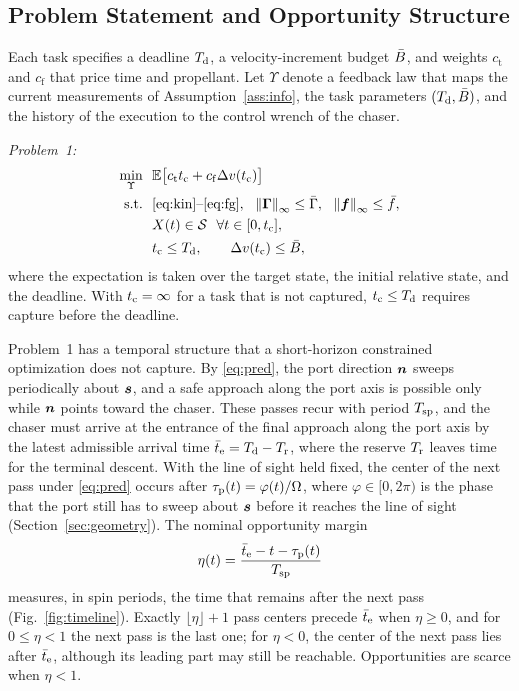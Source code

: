 \subsection{Problem Statement and Opportunity Structure}\label{sec:mission}

Each task specifies a deadline $T_{\mathrm{d}}$, a velocity-increment budget $\bar B$, and weights $c_{\mathrm{t}}$ and $c_{\mathrm{f}}$ that price time and propellant. Let $\Upsilon$ denote a feedback law that maps the current measurements of Assumption~\ref{ass:info}, the task parameters $(T_{\mathrm{d}},\bar B)$, and the history of the execution to the control wrench of the chaser.

\noindent\textit{Problem~1:}
\begin{equation}\label{eq:problem}
\begin{aligned}
\min_{\Upsilon}\ \ & \E\bigl[c_{\mathrm{t}}\tc+c_{\mathrm{f}}\Delta v(\tc)\bigr]\\
\text{s.t.}\ \ & \eqref{eq:kin}\text{--}\eqref{eq:fg},\ \ \norm{\bG}_{\infty}\le\Gmax,\ \ \norm{\bff}_{\infty}\le\fmax,\\
& X(t)\in\Sset\ \ \forall t\in[0,\tc],\\
& \tc\le\Td,\qquad \Delta v(\tc)\le\Bmax,
\end{aligned}
\end{equation}
where the expectation is taken over the target state, the initial relative state, and the deadline. With $t_{\mathrm{c}}=\infty$ for a task that is not captured, $t_{\mathrm{c}}\le T_{\mathrm{d}}$ requires capture before the deadline.

Problem~1 has a temporal structure that a short-horizon constrained optimization does not capture. By \eqref{eq:pred}, the port direction $\boldsymbol{n}$ sweeps periodically about $\boldsymbol{s}$, and a safe approach along the port axis is possible only while $\boldsymbol{n}$ points toward the chaser. These passes recur with period $T_{\mathrm{sp}}$, and the chaser must arrive at the entrance of the final approach along the port axis by the latest admissible arrival time $\bar t_{\mathrm{e}}=T_{\mathrm{d}}-T_{\mathrm{r}}$, where the reserve $T_{\mathrm{r}}$ leaves time for the terminal descent. With the line of sight held fixed, the center of the next pass under \eqref{eq:pred} occurs after $\tau_{\mathrm{p}}(t)=\varphi(t)/\Omega$, where $\varphi\in[0,2\pi)$ is the phase that the port still has to sweep about $\boldsymbol{s}$ before it reaches the line of sight (Section~\ref{sec:geometry}). The nominal opportunity margin
\begin{equation}\label{eq:eta}
\eta(t)=\frac{\bar t_{\mathrm{e}}-t-\tau_{\mathrm{p}}(t)}{T_{\mathrm{sp}}}
\end{equation}
measures, in spin periods, the time that remains after the next pass (Fig.~\ref{fig:timeline}). Exactly $\lfloor\eta\rfloor+1$ pass centers precede $\bar t_{\mathrm{e}}$ when $\eta\ge0$, and for $0\le\eta<1$ the next pass is the last one; for $\eta<0$, the center of the next pass lies after $\bar t_{\mathrm{e}}$, although its leading part may still be reachable. Opportunities are scarce when $\eta<1$.

